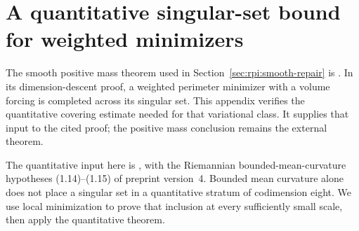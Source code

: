 \section{A quantitative singular-set bound for weighted minimizers}
\label{sec:rpi:weighted-minimizers}

The smooth positive mass theorem used in
Section~\ref{sec:rpi:smooth-repair} is
\cite[Corollary~1.6]{BrendleWang2026}. In its dimension-descent
proof, a weighted perimeter minimizer with a volume forcing is
completed across its singular set. This appendix verifies the
quantitative covering estimate needed for that variational class.
It supplies that input to the cited proof; the positive mass
conclusion remains the external theorem.

The quantitative input here is
\cite[Theorem~1.3]{NaberValtorta2020}, with the Riemannian
bounded-mean-curvature hypotheses (1.14)--(1.15) of preprint
version~4. Bounded mean curvature alone does not place a singular
set in a quantitative stratum of codimension eight. We use local
minimization to prove that inclusion at every sufficiently small
scale, then apply the quantitative theorem.

